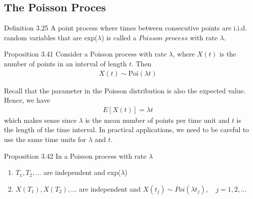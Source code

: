 \subsection{The Poisson Proces}
\begin{boks}{Definition 3.25}
  A point process where times between consecutive points are i.i.d. random variables that are exp($\lambda$) is called a $Poisson$ $process$ with rate $\lambda$.
\end{boks}

\begin{boks}{Proposition 3.41}
  Consider a Poisson process with rate $\lambda$, where $X(t)$ is the number of points in an interval of length $t$.
  Then
  \begin{align*}
    X(t) \sim \text{Poi}(\lambda t)
  \end{align*}
\end{boks}
Recall that the parameter in the Poisson distribution is also the expected value.
Hence, we have
\begin{align*}
  E[X(t)] = \lambda t
\end{align*}
which makes sense since $\lambda$ is the mean number of points per time unit and $t$ is the length of the time interval.
In practical applications, we need to be careful to use the same time units for $\lambda$ and $t$.
\begin{boks}{Proposition 3.42}
  In a Poisson process with rate $\lambda$
  \begin{enumerate}
    \item $T_1, T_2, \ldots$ are independent and exp($\lambda$)
    \item $X(T_1), X(T_2), \ldots$ are independent and $X(t_j) \sim Poi(\lambda t_j), \quad j = 1, 2, \ldots$
  \end{enumerate}
\end{boks}

%

